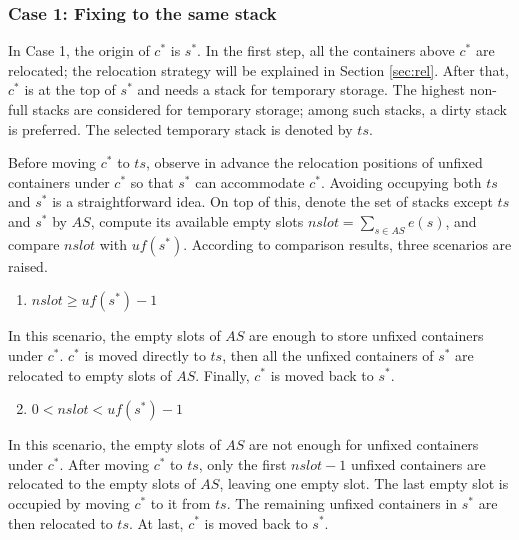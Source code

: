 \documentclass[review,3p,times,authoryear,12pt]{elsarticle}
\begin{document}
\subsubsection{Case 1: Fixing to the same stack}

In Case 1, the origin of $c^*$ is $s^*$.
In the first step, all the containers above $c^*$ are relocated; the relocation strategy will be explained in Section \ref{sec:rel}.
After that, $c^*$ is at the top of $s^*$ and needs a stack for temporary storage.
The highest non-full stacks are considered for temporary storage; among such stacks, a dirty stack is preferred. The selected temporary stack is denoted by $\mathit{ts}$.

Before moving $c^*$ to $\mathit{ts}$, observe in advance the relocation positions of unfixed containers under $c^*$ so that $s^*$ can accommodate $c^*$.
Avoiding occupying both $\mathit{ts}$ and $s^*$ is a straightforward idea.
On top of this, denote the set of stacks except $\mathit{ts}$ and $s^*$ by $\mathit{AS}$, compute its available empty slots $\mathit{nslot} = \sum_{s\in \mathit{AS}}e(s)$, and compare $\mathit{nslot}$ with $\mathit{uf}(s^*)$.
According to comparison results, three scenarios are raised.

\begin{enumerate}
\setcounter{enumi}{0}
\item $\mathit{nslot}\ge \mathit{uf}(s^*)-1$
\end{enumerate}

In this scenario, the empty slots of $\mathit{AS}$ are enough to store unfixed containers under $c^*$. $c^*$ is moved directly to $\mathit{ts}$, then all the unfixed containers of $s^*$ are relocated to empty slots of $\mathit{AS}$.
Finally, $c^*$ is moved back to $s^*$.

\begin{enumerate}
\setcounter{enumi}{1}
\item $0<\mathit{nslot}< \mathit{uf}(s^*)-1$
\end{enumerate}

In this scenario, the empty slots of $\mathit{AS}$ are not enough for unfixed containers under $c^*$. After moving $c^*$ to $\mathit{ts}$, only the first $\mathit{nslot}-1$ unfixed containers are relocated to the empty slots of $\mathit{AS}$, leaving one empty slot.
The last empty slot is occupied by moving $c^*$ to it from $\mathit{ts}$.
The remaining unfixed containers in $s^*$ are then relocated to $\mathit{ts}$.
At last, $c^*$ is moved back to $s^*$.
\end{document}
